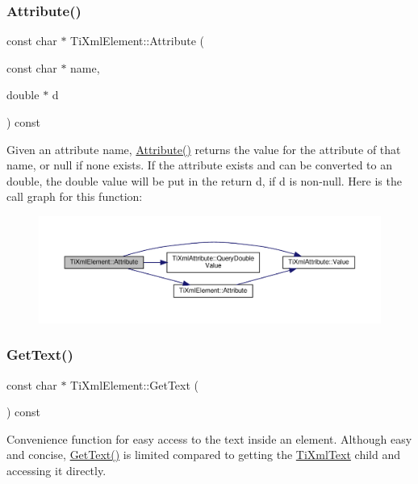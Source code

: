 \subsubsection{\texorpdfstring{Attribute()}{Attribute()}\hspace{0.1cm}{\footnotesize\ttfamily [3/3]}}
{\footnotesize\ttfamily const char $\ast$ Ti\+Xml\+Element\+::\+Attribute (\begin{DoxyParamCaption}\item[{const char $\ast$}]{name,  }\item[{double $\ast$}]{d }\end{DoxyParamCaption}) const}

Given an attribute name, \hyperlink{classTiXmlElement_a6042f518748f475a7ac4b4e0b509eb05}{Attribute()} returns the value for the attribute of that name, or null if none exists. If the attribute exists and can be converted to an double, the double value will be put in the return \textquotesingle{}d\textquotesingle{}, if \textquotesingle{}d\textquotesingle{} is non-\/null. Here is the call graph for this function\+:
\nopagebreak
\begin{figure}[H]
\begin{center}
\leavevmode
\includegraphics[width=350pt]{classTiXmlElement_a09df893402d0ab1402c8725e6d30ec04_cgraph}
\end{center}
\end{figure}
\mbox{\label{classTiXmlElement_af0f814ecbd43d50d4cdbdf4354d3da39}} 
\subsubsection{\texorpdfstring{Get\+Text()}{GetText()}}
{\footnotesize\ttfamily const char $\ast$ Ti\+Xml\+Element\+::\+Get\+Text (\begin{DoxyParamCaption}{ }\end{DoxyParamCaption}) const}

Convenience function for easy access to the text inside an element. Although easy and concise, \hyperlink{classTiXmlElement_af0f814ecbd43d50d4cdbdf4354d3da39}{Get\+Text()} is limited compared to getting the \hyperlink{classTiXmlText}{Ti\+Xml\+Text} child and accessing it directly.

